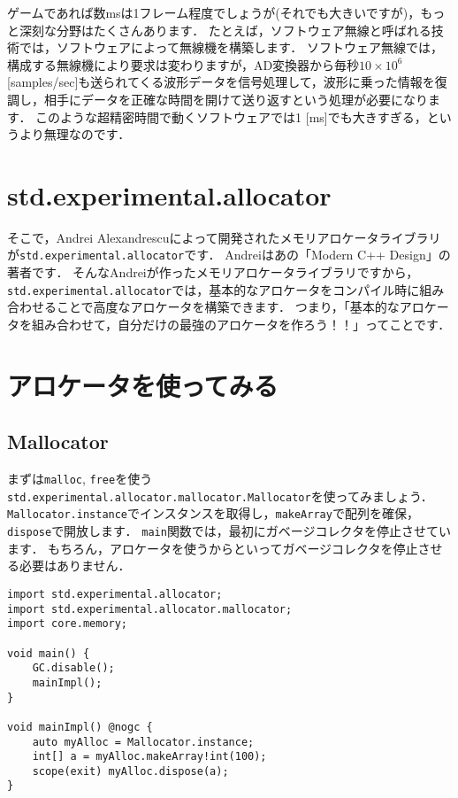 ゲームであれば数msは1フレーム程度でしょうが(それでも大きいですが)，もっと深刻な分野はたくさんあります．
たとえば，ソフトウェア無線と呼ばれる技術では，ソフトウェアによって無線機を構築します．
ソフトウェア無線では，構成する無線機により要求は変わりますが，AD変換器から毎秒$10 \times 10^6$ [samples/sec]も送られてくる波形データを信号処理して，波形に乗った情報を復調し，相手にデータを正確な時間を開けて送り返すという処理が必要になります．
このような超精密時間で動くソフトウェアでは1
{[}ms{]}でも大きすぎる，というより無理なのです．


\section{std.experimental.allocator}

そこで，Andrei Alexandrescuによって開発されたメモリアロケータライブラリが\texttt{std.experimental.allocator}です．
Andreiはあの「Modern C++ Design」の著者です．
そんなAndreiが作ったメモリアロケータライブラリですから，
\texttt{std.experimental.allocator}では，基本的なアロケータをコンパイル時に組み合わせることで高度なアロケータを構築できます．
つまり，「基本的なアロケータを組み合わせて，自分だけの最強のアロケータを作ろう！！」ってことです．


\section{アロケータを使ってみる}


\subsection{Mallocator}

まずは\texttt{malloc},
\texttt{free}を使う\texttt{std.experimental.allocator.mallocator.Mallocator}を使ってみましょう．
\texttt{Mallocator.instance}でインスタンスを取得し，\texttt{makeArray}で配列を確保，\texttt{dispose}で開放します．
\texttt{main}関数では，最初にガベージコレクタを停止させています．
もちろん，アロケータを使うからといってガベージコレクタを停止させる必要はありません．

\begin{lstlisting}[]
import std.experimental.allocator;
import std.experimental.allocator.mallocator;
import core.memory;

void main() {
    GC.disable();
    mainImpl();
}

void mainImpl() @nogc {
    auto myAlloc = Mallocator.instance;
    int[] a = myAlloc.makeArray!int(100);
    scope(exit) myAlloc.dispose(a);
}
\end{lstlisting}


